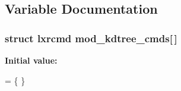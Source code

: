 \subsection{Variable Documentation}
\hypertarget{src_2kdtree_2kdtree-util_8c_a6d6d4e6caae0bbbe6c59f4faf2d7cbd6}{
\subsubsection[{mod\+\_\+kdtree\+\_\+cmds}]{\setlength{\rightskip}{0pt plus 5cm}struct lxrcmd mod\+\_\+kdtree\+\_\+cmds\mbox{[}$\,$\mbox{]}}}\label{src_2kdtree_2kdtree-util_8c_a6d6d4e6caae0bbbe6c59f4faf2d7cbd6}
{\bfseries Initial value\+:}
\begin{DoxyCode}
= \{
\}
\end{DoxyCode}
